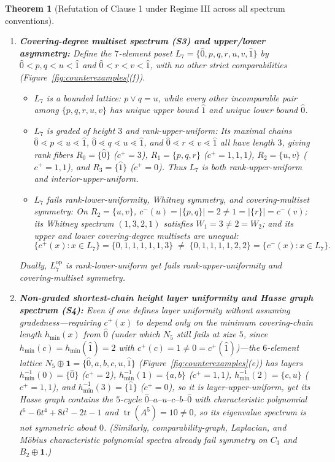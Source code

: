 \documentclass[11pt,a4paper]{article}
\newtheorem{theorem}{Theorem}[section]
\theoremstyle{definition}
\theoremstyle{remark}
\newcommand{\cov}{\lessdot}
\newcommand{\tr}{\operatorname{tr}}
\newcommand{\op}{\mathrm{op}}
\begin{document}
\begin{theorem}[Refutation of Clause 1 under Regime III across all spectrum conventions]
\begin{enumerate}
  \item[(2)] \textbf{Covering-degree multiset spectrum (S3) and upper/lower asymmetry:} Define the $7$-element poset $L_7 = \{\hat{0}, p, q, r, u, v, \hat{1}\}$ by $\hat{0} < p, q < u < \hat{1}$ and $\hat{0} < r < v < \hat{1}$, with no other strict comparabilities (Figure~\ref{fig:counterexamples}(f)).
  \begin{itemize}
    \item \emph{$L_7$ is a bounded lattice:} $p \vee q = u$, while every other incomparable pair among $\{p,q,r,u,v\}$ has unique upper bound $\hat{1}$ and unique lower bound $\hat{0}$.
    \item \emph{$L_7$ is graded of height $3$ and rank-upper-uniform:} Its maximal chains $\hat{0} \cov p \cov u \cov \hat{1}$, $\hat{0} \cov q \cov u \cov \hat{1}$, and $\hat{0} \cov r \cov v \cov \hat{1}$ all have length $3$, giving rank fibers $R_0 = \{\hat{0}\}$ ($c^+=3$), $R_1 = \{p,q,r\}$ ($c^+=1,1,1$), $R_2 = \{u,v\}$ ($c^+=1,1$), and $R_3 = \{\hat{1}\}$ ($c^+=0$). Thus $L_7$ is both rank-upper-uniform and interior-upper-uniform.
    \item \emph{$L_7$ fails rank-lower-uniformity, Whitney symmetry, and covering-multiset symmetry:} On $R_2 = \{u,v\}$, $c^-(u) = |\{p,q\}| = 2 \neq 1 = |\{r\}| = c^-(v)$; its Whitney spectrum $(1,3,2,1)$ satisfies $W_1 = 3 \neq 2 = W_2$; and its upper and lower covering-degree multisets are \emph{unequal}:
    \[
      \{c^+(x) : x \in L_7\} = \{0, 1, 1, 1, 1, 1, 3\} \;\neq\; \{0, 1, 1, 1, 1, 2, 2\} = \{c^-(x) : x \in L_7\}.
    \]
  \end{itemize}
  Dually, $L_7^\op$ is rank-lower-uniform yet fails rank-upper-uniformity and covering-multiset symmetry.

  \item[(3)] \textbf{Non-graded shortest-chain height layer uniformity and Hasse graph spectrum (S4):} Even if one defines layer uniformity \emph{without} assuming gradedness---requiring $c^+(x)$ to depend only on the minimum covering-chain length $h_{\min}(x)$ from $\hat{0}$ (under which $N_5$ still fails at size $5$, since $h_{\min}(c) = h_{\min}(\hat{1}) = 2$ with $c^+(c) = 1 \neq 0 = c^+(\hat{1})$)---the $6$-element lattice $N_5 \oplus \mathbf{1} = \{\hat{0}, a, b, c, u, \hat{1}\}$ (Figure~\ref{fig:counterexamples}(e)) has layers $h_{\min}^{-1}(0) = \{\hat{0}\}$ ($c^+=2$), $h_{\min}^{-1}(1) = \{a,b\}$ ($c^+=1,1$), $h_{\min}^{-1}(2) = \{c,u\}$ ($c^+=1,1$), and $h_{\min}^{-1}(3) = \{\hat{1}\}$ ($c^+=0$), so it is layer-upper-uniform, yet its Hasse graph contains the $5$-cycle $\hat{0}\text{--}a\text{--}u\text{--}c\text{--}b\text{--}\hat{0}$ with characteristic polynomial $t^6 - 6t^4 + 8t^2 - 2t - 1$ and $\tr(A^5) = 10 \neq 0$, so its eigenvalue spectrum is not symmetric about $0$. (Similarly, comparability-graph, Laplacian, and M\"obius characteristic polynomial spectra already fail symmetry on $C_3$ and $B_2 \oplus \mathbf{1}$.)
\end{enumerate}
\end{theorem}
\end{document}
